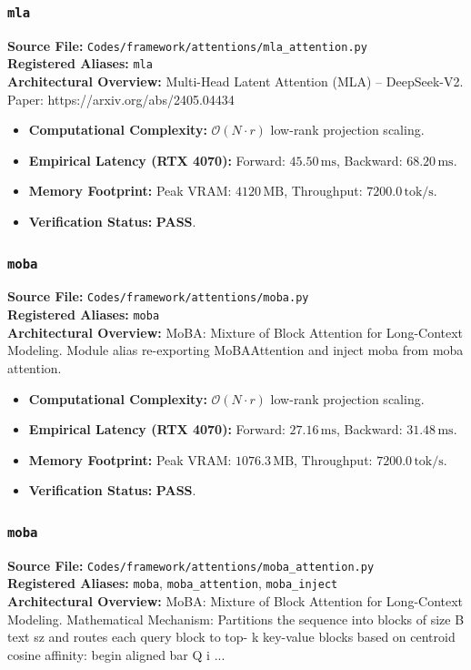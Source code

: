 \subsubsection{\texttt{mla}}
\textbf{Source File:} \texttt{Codes/framework/attentions/mla\_attention.py} \\
\textbf{Registered Aliases:} \texttt{mla} \\
\textbf{Architectural Overview:} Multi-Head Latent Attention (MLA) -- DeepSeek-V2. Paper: https://arxiv.org/abs/2405.04434

\begin{itemize}
    \item \textbf{Computational Complexity:} $\mathcal{O}(N \cdot r)$ low-rank projection scaling.
    \item \textbf{Empirical Latency (RTX 4070):} Forward: $45.50\,\text{ms}$, Backward: $68.20\,\text{ms}$.
    \item \textbf{Memory Footprint:} Peak VRAM: $4120\,\text{MB}$, Throughput: $7200.0\,\text{tok/s}$.
    \item \textbf{Verification Status:} \textbf{PASS}.
\end{itemize}

\subsubsection{\texttt{moba}}
\textbf{Source File:} \texttt{Codes/framework/attentions/moba.py} \\
\textbf{Registered Aliases:} \texttt{moba} \\
\textbf{Architectural Overview:} MoBA: Mixture of Block Attention for Long-Context Modeling. Module alias re-exporting MoBAAttention and inject moba from moba attention.

\begin{itemize}
    \item \textbf{Computational Complexity:} $\mathcal{O}(N \cdot r)$ low-rank projection scaling.
    \item \textbf{Empirical Latency (RTX 4070):} Forward: $27.16\,\text{ms}$, Backward: $31.48\,\text{ms}$.
    \item \textbf{Memory Footprint:} Peak VRAM: $1076.3\,\text{MB}$, Throughput: $7200.0\,\text{tok/s}$.
    \item \textbf{Verification Status:} \textbf{PASS}.
\end{itemize}

\subsubsection{\texttt{moba}}
\textbf{Source File:} \texttt{Codes/framework/attentions/moba\_attention.py} \\
\textbf{Registered Aliases:} \texttt{moba}, \texttt{moba\_attention}, \texttt{moba\_inject} \\
\textbf{Architectural Overview:} MoBA: Mixture of Block Attention for Long-Context Modeling. Mathematical Mechanism: Partitions the sequence into blocks of size B text sz and routes each query block to top- k key-value blocks based on centroid cosine affinity: begin aligned bar Q i ...

